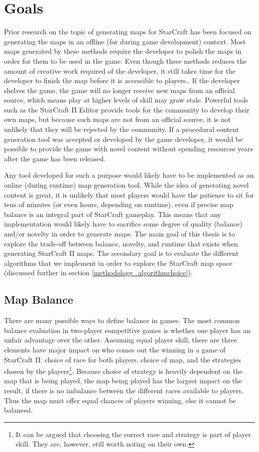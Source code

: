\chapter{Goals}
\label{goals}
Prior research on the topic of generating maps for StarCraft has been focused on generating the maps in an offline (for during game development) context. Most maps generated by these methods require the developer to polish the maps in order for them to be used in the game. Even though these methods reduces the amount of creative work required of the developer, it still takes time for the developer to finish the map before it is accessible to players.. If the developer shelves the game, the game will no longer receive new maps from an official source, which means play at higher levels of skill may grow stale. Powerful tools such as the StarCraft II Editor provide tools for the community to develop their own maps, but because such maps are not from an official source, it is not unlikely that they will be rejected by the community. If a procedural content generation tool was accepted or developed by the game developer, it would be possible to provide the game with novel content without spending resources years after the game has been released.

Any tool developed for such a purpose would likely have to be implemented as an online (during runtime) map generation tool. While the idea of generating novel content is great, it is unlikely that most players would have the patience to sit for tens of minutes (or even hours, depending on runtime), even if precise map balance is an integral part of StarCraft gameplay. This means that any implementation would likely have to sacrifice some degree of quality (balance) and/or novelty in order to generate maps. The main goal of this thesis is to explore the trade-off between balance, novelty, and runtime that exists when generating StarCraft II maps. The secondary goal is to evaluate the different algorithms that we implement in order to explore the StarCraft map space (discussed further in section \ref{methodology_algorithmchoice}).

\section{Map Balance}
\label{goals_balance}
There are many possible ways to define balance in games. The most common balance evaluation in two-player competitive games is whether one player has an unfair advantage over the other. Assuming equal player skill, there are three elements have major impact on who comes out the winning in a game of StarCraft II: choice of race for both players, choice of map, and the strategies chosen by the players\footnote{It can be argued that choosing the correct race and strategy is part of player skill. They are, however, still worth noting on their own.}. Because choice of strategy is heavily dependent on the map that is being played, the map being played has the largest impact on the result, if there is no imbalance between the different races available to players. Thus the map must offer equal chances of players winning, else it cannot be balanced.

